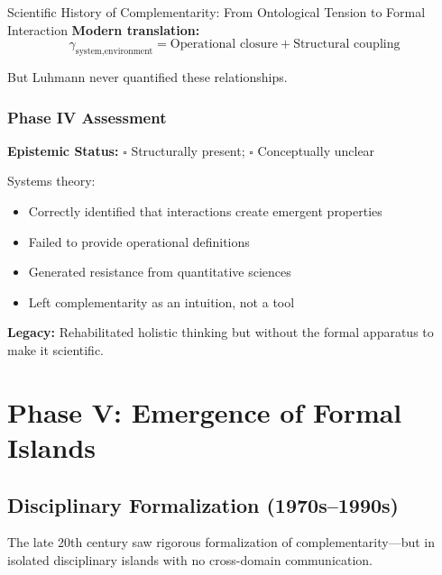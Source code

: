 \begin{chapter}{Scientific History of Complementarity: From Ontological Tension to Formal Interaction}
\textbf{Modern translation:}
\[
\gamma_{\text{system,environment}} = \text{Operational closure} + \text{Structural coupling}
\]

But Luhmann never quantified these relationships.

\subsubsection{Phase IV Assessment}

\begin{tcolorbox}[colback=orange!5!white,colframe=orange!75!black,title=\textbf{Phase IV Verdict}]
\textbf{Epistemic Status:} $\square$ Structurally present; $\square$ Conceptually unclear

Systems theory:
\begin{itemize}[noitemsep]
    \item Correctly identified that interactions create emergent properties
    \item Failed to provide operational definitions
    \item Generated resistance from quantitative sciences
    \item Left complementarity as an intuition, not a tool
\end{itemize}

\textbf{Legacy:} Rehabilitated holistic thinking but without the formal apparatus to make it scientific.
\end{tcolorbox}

\section{Phase V: Emergence of Formal Islands}
\label{sec:phase-v}

\subsection{Disciplinary Formalization (1970s--1990s)}

\begin{tcolorbox}[colback=green!5!white,colframe=green!75!black,title=\textbf{The Fragmentation Paradox}]
The late 20th century saw rigorous formalization of complementarity---but in isolated disciplinary islands with no cross-domain communication.
\end{tcolorbox}


\end{chapter}

